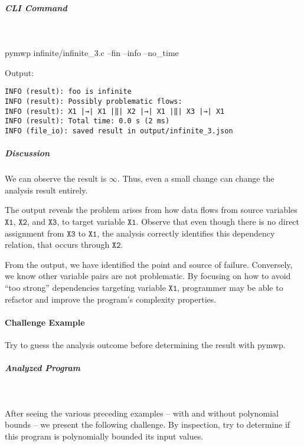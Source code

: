 \subparagraph*{CLI Command}\mbox{}\\
\begin{console}[label={lst:ex4-run-cmd}]
pymwp infinite/infinite_3.c --fin --info --no_time
\end{console}

Output:

\begin{lstlisting}[escapeinside=||,label={lst:ex4-output}]
INFO (result): foo is infinite
INFO (result): Possibly problematic flows:
INFO (result): X1 |→| X1 |‖| X2 |→| X1 |‖| X3 |→| X1
INFO (result): Total time: 0.0 s (2 ms)
INFO (file_io): saved result in output/infinite_3.json
\end{lstlisting}

\subparagraph*{Discussion}

We can observe the result is \(\infty\).
Thus, even a small change can change the analysis result entirely.

The output reveals the problem arises from how data flows from source variables \(\texttt{X1}\), \(\texttt{X2}\), and \(\texttt{X3}\), to target variable \(\texttt{X1}\).
Observe that even though there is no direct assignment from \(\texttt{X3}\) to \(\texttt{X1}\), the analysis correctly identifies this dependency relation, that occurs through \(\texttt{X2}\).

From the output, we have identified the point and source of failure.
Conversely, we know other variable pairs are not problematic.
By focusing on how to avoid ``too strong'' dependencies targeting variable \(\texttt{X1}\), programmer may be able to refactor and improve the program's complexity properties.

\pagebreak

\paragraph{Challenge Example}\label{challenge-example}
Try to guess the analysis outcome before determining the result with pymwp.

\subparagraph*{Analyzed Program}\mbox{}\\
\begin{minipage}{\textwidth}

\end{minipage}

After seeing the various preceding examples -- with and without polynomial bounds -- we present the following challenge.
By inspection, try to determine if this program is polynomially bounded \wrt its input values.

